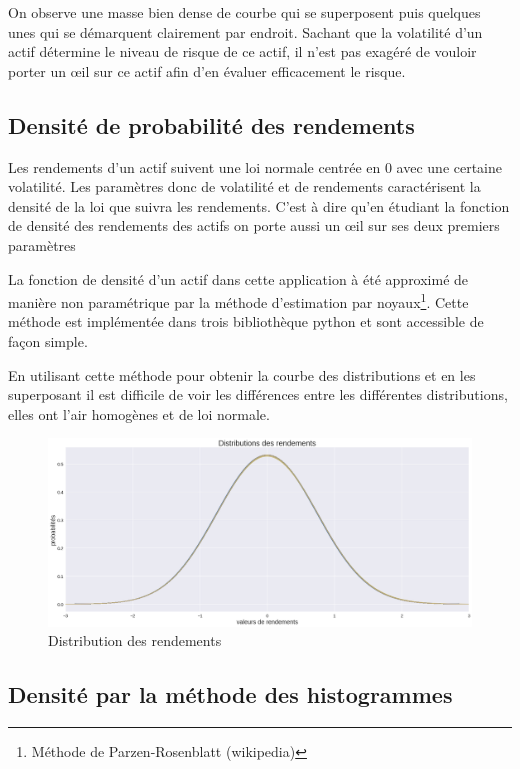 On observe une masse bien dense de courbe qui se superposent puis quelques unes qui se démarquent clairement par endroit.
Sachant que la volatilité d'un actif détermine le niveau de risque de ce actif, il n'est pas exagéré de vouloir porter un œil sur ce actif afin d'en évaluer efficacement le risque.

\subsection{Densité de probabilité des rendements}

Les rendements d'un actif suivent une loi normale centrée en 0 avec une certaine volatilité.  Les paramètres donc de volatilité et de rendements caractérisent la densité de la loi que suivra les rendements. C'est à dire qu'en étudiant la fonction de densité des rendements des actifs on porte aussi un œil sur ses deux premiers paramètres

La fonction de densité d'un actif dans cette application à été approximé de manière non paramétrique par la méthode d'estimation par noyaux\footnote{ Méthode de Parzen-Rosenblatt (wikipedia)}. Cette méthode est implémentée dans trois bibliothèque python et sont accessible de façon simple.

En utilisant cette méthode pour obtenir la courbe des distributions et en les superposant il est difficile de voir les différences entre les différentes distributions, elles ont l'air homogènes et de loi normale.

\begin{figure}[H]
\centering
\caption{Distribution des rendements}
   \includegraphics[scale=0.35]{img/distrib.png}
\end{figure}

\subsection{Densité par la méthode des histogrammes}

